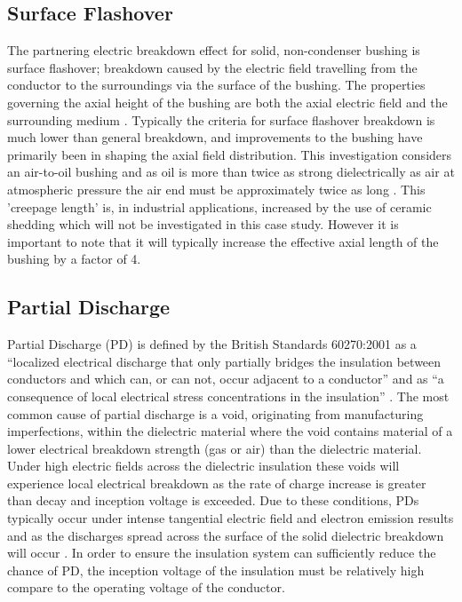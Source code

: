 \subsection{Surface Flashover}
The partnering electric breakdown effect for solid, non-condenser bushing is surface flashover; breakdown caused by the electric field travelling from the conductor to the surroundings via the surface of the bushing. The properties governing the axial height of the bushing are both the axial electric field and the surrounding medium \cite{HVEngandTesting}. Typically the criteria for surface flashover breakdown is much lower than general breakdown, and improvements to the bushing have primarily been in shaping the axial field distribution. This investigation considers an air-to-oil bushing and as oil is more than twice as strong dielectrically as air at atmospheric pressure the air end must be approximately twice as long \cite{harlow2004electric}. This 'creepage length' is, in industrial applications, increased by the use of ceramic shedding which will not be investigated in this case study. However it is important to note that it will typically increase the effective axial length of the bushing by a factor of 4.

\subsection{Partial Discharge}
Partial Discharge (PD) is defined by the British Standards 60270:2001 as a “localized electrical discharge that only partially bridges the insulation between conductors and which can, or can not, occur adjacent to a conductor” and as “a consequence of local electrical stress concentrations in the insulation” \cite{60270}. The most common cause of partial discharge is a void, originating from manufacturing imperfections, within the dielectric material where the void contains material of a lower electrical breakdown strength (gas or air) than the dielectric material. Under high electric fields across the dielectric insulation these voids will experience local electrical breakdown as the rate of charge increase is greater than decay and inception voltage is exceeded. Due to these conditions, PDs typically occur under intense tangential electric field and electron emission results \cite{surfaceflashover} and as the discharges spread across the surface of the solid dielectric breakdown will occur \cite{kuffel2000high}. In order to ensure the insulation system can sufficiently reduce the chance of PD, the inception voltage of the insulation must be relatively high compare to the operating voltage of the conductor.

